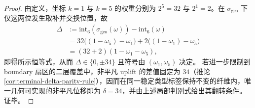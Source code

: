 \begin{proof}
由定义，坐标 \(k=1\) 与 \(k=5\) 的权重分别为 \(2^5=32\) 与 \(2^1=2\)。在 \(\sigma_{\mathrm{geo}}\) 下仅这两位发生取补并交换位置，故
\[
\begin{aligned}
\Delta
&:=\mathrm{int}_6(\sigma_{\mathrm{geo}}(\omega))-\mathrm{int}_6(\omega)\\
&=32\bigl((1-\omega_5)-\omega_1\bigr)+2\bigl((1-\omega_1)-\omega_5\bigr)\\
&=(32+2)(1-\omega_1-\omega_5),
\end{aligned}
\]
即得所示恒等式，从而 \(\Delta\in\{0,\pm 34\}\) 且符号由 \((\omega_1,\omega_5)\) 决定。
若进一步限制到 boundary 扇区的二层覆盖中，非平凡 uplift 的差值固定为 \(34\)（推论 \ref{cor:terminal-delta-parity-rule}），因而在同一稳定类型标签保持不变的纤维内，唯一几何可实现的非平凡位移即为 \(\delta=34\)，并由上述局部判别式给出其翻转条件。证毕。
\end{proof}

